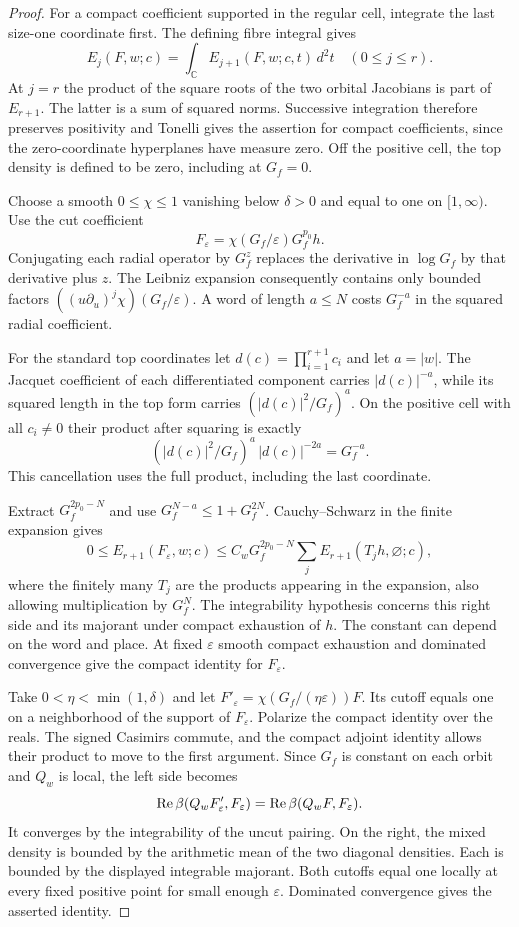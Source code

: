 \begin{proof}
For a compact coefficient supported in the regular cell, integrate the last size-one coordinate first. The defining fibre integral gives
\[
 E_j(F,w;c)=\int_{\mathbb C} E_{j+1}(F,w;c,t)\,d^2t
          \quad(0\le j\le r).
\]
At \(j=r\) the product of the square roots of the two orbital Jacobians is part of \(E_{r+1}\). The latter is a sum of squared norms. Successive integration therefore preserves positivity and Tonelli gives the assertion for compact coefficients, since the zero-coordinate hyperplanes have measure zero. Off the positive cell, the top density is defined to be zero, including at \(G_f=0\).

Choose a smooth \(0\le\chi\le1\) vanishing below \(\delta>0\) and equal to one on \([1,\infty)\). Use the cut coefficient
\[
                    F_\varepsilon=\chi(G_f/\varepsilon)G_f^{p_0}h .
\] Conjugating each radial operator by \(G_f^z\) replaces the derivative in \(\log G_f\) by that derivative plus \(z\). The Leibniz expansion consequently contains only bounded factors \(((u\partial_u)^j\chi)(G_f/\varepsilon)\). A word of length \(a\le N\) costs \(G_f^{-a}\) in the squared radial coefficient.

For the standard top coordinates let \(d(c)=\prod_{i=1}^{r+1}c_i\) and let \(a=|w|\). The Jacquet coefficient of each differentiated component carries \(|d(c)|^{-a}\), while its squared length in the top form carries \((|d(c)|^2/G_f)^a\). On the positive cell with all \(c_i\ne0\) their product after squaring is exactly
\[
       (|d(c)|^2/G_f)^a\,|d(c)|^{-2a}=G_f^{-a}.
\]
This cancellation uses the full product, including the last coordinate.

Extract \(G_f^{2p_0-N}\) and use \(G_f^{N-a}\le1+G_f^{2N}\). Cauchy--Schwarz in the finite expansion gives
\[
 0\le E_{r+1}(F_\varepsilon,w;c)
 \le C_w G_f^{2p_0-N}\sum_j E_{r+1}(T_j h,\varnothing;c),
\]
where the finitely many \(T_j\) are the products appearing in the expansion, also allowing multiplication by \(G_f^N\). The integrability hypothesis concerns this right side and its majorant under compact exhaustion of \(h\). The constant can depend on the word and place. At fixed \(\varepsilon\) smooth compact exhaustion and dominated convergence give the compact identity for \(F_\varepsilon\).

Take \(0<\eta<\min(1,\delta)\) and let \(F'_\varepsilon=\chi(G_f/(\eta\varepsilon))F\). Its cutoff equals one on a neighborhood of the support of \(F_\varepsilon\). Polarize the compact identity over the reals. The signed Casimirs commute, and the compact adjoint identity allows their product to move to the first argument. Since \(G_f\) is constant on each orbit and \(Q_w\) is local, the left side becomes
\[
 \operatorname{Re}\beta(Q_wF'_\varepsilon,F_\varepsilon)
       =\operatorname{Re}\beta(Q_w F,F_\varepsilon).
\]
It converges by the integrability of the uncut pairing. On the right, the mixed density is bounded by the arithmetic mean of the two diagonal densities. Each is bounded by the displayed integrable majorant. Both cutoffs equal one locally at every fixed positive point for small enough \(\varepsilon\). Dominated convergence gives the asserted identity.
\end{proof}

